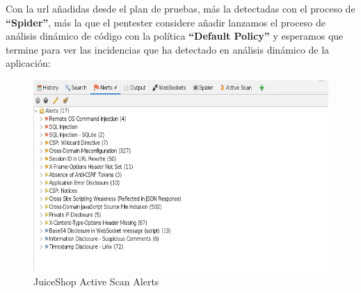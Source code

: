Con la url añadidas desde el plan de pruebas, más la detectadas con el proceso de \textbf{“Spider”}, más la que el pentester 
considere añadir lanzamos el proceso de análisis dinámico de código con  la política \textbf{“Default Policy”} y esperamos
que termine para ver las incidencias que ha detectado en análisis dinámico de la aplicación:\\

\begin{figure}[!htb]
    \captionsetup{width=1\linewidth}  
    \includegraphics[width=\linewidth]{./imagenes/04_1_3_04_JuiceShop_ZapProxyActiveScanResult.png}
    \caption{JuiceShop Active Scan Alerts}  
    \label{fig:JuiceShop Active Scan Alerts}
\end{figure}
